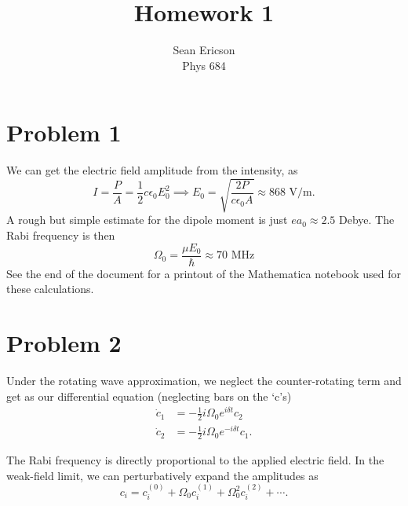 \documentclass[12pt]{article}
\begin{document}
	
\title{Homework 1}
\author{Sean Ericson \\ Phys 684}
\maketitle

\section*{Problem 1}
We can get the electric field amplitude from the intensity, as
\[ I = \frac{P}{A} = \frac{1}{2}c\epsilon_0E_0^2 \implies E_0 = \sqrt{\frac{2P}{c\epsilon_0A}} \approx 868\text{ V/m}.\]
A rough but simple estimate for the dipole moment is just $e a_0 \approx 2.5$ Debye. The Rabi frequency is then
\[ \Omega_0 = \frac{\mu E_0}{\hbar} \approx 70\text{ MHz} \]
See the end of the document for a printout of the Mathematica notebook used for these calculations.

\section*{Problem 2}
Under the rotating wave approximation, we neglect the counter-rotating term and get as our differential equation (neglecting bars on the `c's)
\begin{align*}
    \dot{c}_1 &= -\frac{1}{2}i\Omega_0e^{i\delta t}c_2 \\
    \dot{c}_2 &= -\frac{1}{2}i\Omega_0e^{-i\delta t}c_1.
\end{align*}

The Rabi frequency is directly proportional to the applied electric field. In the weak-field limit, we can perturbatively expand the amplitudes as
\[ c_i = c_i^{(0)} + \Omega_0 c_i^{(1)} + \Omega_0^2 c_i^{(2)} + \cdots. \]
\end{document}
